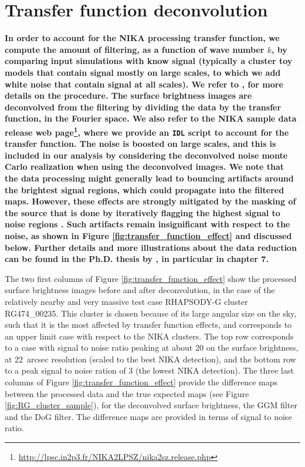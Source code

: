 \documentclass[twocolumn,traditabstract]{aa}
\begin{document}
\section{Transfer function deconvolution}\label{sec:Transfer_function_deconvolution}
{\bf In order to account for the NIKA processing transfer function, we compute the amount of filtering, as a function of wave number $k$, by comparing input simulations with know signal (typically a cluster toy models that contain signal mostly on large scales, to which we add white noise that contain signal at all scales). We refer to \cite{Adam2015,Adam2016a}, for more details on the procedure. The surface brightness images are deconvolved from the filtering by dividing the data by the transfer function, in the Fourier space. We also refer to the NIKA sample data release web page\footnote{\url{http://lpsc.in2p3.fr/NIKA2LPSZ/nika2sz.release.php}}, where we provide an {\tt IDL} script to account for the transfer function. The noise is boosted on large scales, and this is included in our analysis by considering the deconvolved noise monte Carlo realization when using the deconvolved images. We note that the data processing might generally lead to bouncing artifacts around the brightest signal regions, which could propagate into the filtered maps. However, these effects are strongly mitigated by the masking of the source that is done by iteratively flagging the highest signal to noise regions \citep[see][]{Adam2015}. Such artifacts remain insignificant with respect to the noise, as shown in Figure \ref{fig:transfer_function_effect} and discussed below. Further details and more illustrations about the data reduction can be found in the Ph.D. thesis by \cite{Adam2015Thesis}, in particular in chapter 7.

The two first columns of Figure \ref{fig:transfer_function_effect} show the processed surface brightness images before and after deconvolution, in the case of the relatively nearby and very massive test case RHAPSODY-G cluster RG474\_00235. This cluster is chosen because of its large angular size on the sky, such that it is the most affected by transfer function effects, and corresponds to an upper limit case with respect to the NIKA clusters. The top row corresponds to a case with signal to noise ratio peaking at about 20 on the surface brightness, at 22~arcsec resolution (scaled to the best NIKA detection), and the bottom row to a peak signal to noise ration of 3 (the lowest NIKA detection). The three last columns of Figure \ref{fig:transfer_function_effect} provide the difference maps between the processed data and the true expected maps (see Figure \ref{fig:RG_cluster_sample}), for the deconvolved surface brightness, the GGM filter and the DoG filter. The difference maps are provided in terms of signal to noise ratio.

}
\end{document}
